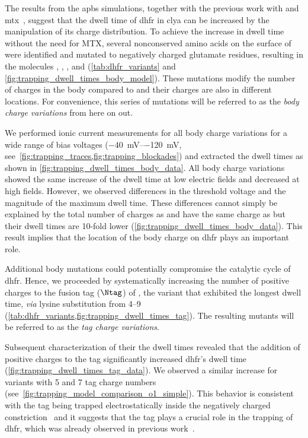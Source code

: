 The results from the \gls{apbs} simulations, together with the previous work with \DHFRt{} and
\gls{mtx}~\cite{Soskine-Biesemans-2015}, suggest that the dwell time of \gls{dhfr} in \gls{clya} can be
increased by the manipulation of its charge distribution. To achieve the increase in dwell time without the
need for MTX, several nonconserved amino acids on the surface of  were identified and mutated to
negatively charged glutamate residues, resulting in the molecules , , , and
 (\cref{tab:dhfr_variants} and \cref{fig:trapping_dwell_times_body_model}). These mutations modify
the number of charges in the body compared to  and their charges are also in different locations.
For convenience, this series of mutations will be referred to as the \emph{body charge variations} from here
on out.

We performed ionic current measurements for all body charge variations for a wide range of bias voltages
(\SIrange{-40}{-120}{\mV}, see~\cref{fig:trapping_traces,fig:trapping_blockades}) and extracted the dwell
times as shown in \cref{fig:trapping_dwell_times_body_data}. All body charge variations showed the same
increase of the dwell time at low electric fields and decreased at high fields. However, we observed
differences in the threshold voltage and the magnitude of the maximum dwell time. These differences cannot
simply be explained by the total number of charges as  and  have the same charge as
 but their dwell times are 10-fold lower (\cref{fig:trapping_dwell_times_body_data}). This result
implies that the location of the body charge on \gls{dhfr} plays an important role.

Additional body mutations could potentially compromise the catalytic cycle of \gls{dhfr}\@. Hence, we
proceeded by systematically increasing the number of positive charges to the fusion tag ($\Ntag$) of
, the variant that exhibited the longest dwell time, \textit{via} lysine substitution from
\SIrange{+4}{+9}{\ec} (\cref{tab:dhfr_variants,fig:trapping_dwell_times_tag}). The resulting
 mutants  will be referred to as the \emph{tag charge variations}.

Subsequent characterization of their the dwell times revealed that the addition of positive charges to the tag
significantly increased \gls{dhfr}'s dwell time (\cref{fig:trapping_dwell_times_tag_data}). We observed a
similar increase for  variants with \num{+5} and \num{+7} tag charge numbers
(see~\cref{fig:trapping_model_comparison_o1_simple}). This behavior is consistent with the tag being trapped
electrostatically inside the negatively charged \transi{}
constriction~\cite{Franceschini-2016,Movileanu-2005,Asandei-2015,Asandei-2016} and it suggests that the tag
plays a crucial role in the trapping of \gls{dhfr}, which was already observed in previous
work~\cite{Soskine-Biesemans-2015}.

